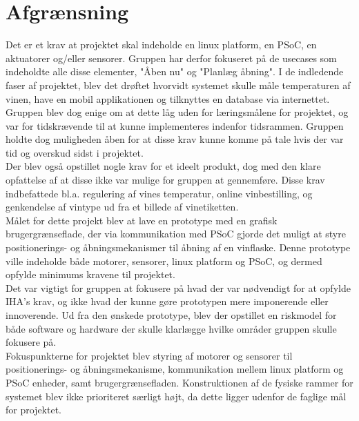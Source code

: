 \chapter{Afgrænsning}
Det er et krav at projektet skal indeholde en linux platform, en PSoC, en aktuatorer og/eller sensorer. Gruppen har derfor fokuseret på de usecases som 
indeholdte alle disse elementer, "Åben nu" og "Planlæg åbning". I de indledende faser af projektet, blev det drøftet hvorvidt systemet skulle måle temperaturen
af vinen, have en mobil applikationen og tilknyttes en database via internettet. Gruppen blev dog enige om at dette låg uden for læringsmålene for projektet, 
og var for tidskrævende til at kunne implementeres indenfor tidsrammen. Gruppen holdte dog muligheden åben for at disse krav kunne komme på tale hvis der var
tid og overskud sidst i projektet. \\

Der blev også opstillet nogle krav for et ideelt produkt, dog med den klare opfattelse af at disse ikke var mulige for gruppen at gennemføre. Disse krav 
indbefattede bl.a. regulering af vines temperatur, online vinbestilling, og genkendelse af vintype ud fra et billede af vinetiketten.\\

Målet for dette projekt blev at lave en prototype med en grafisk brugergrænseflade, der via kommunikation med PSoC gjorde det muligt at styre positionerings- 
og åbningsmekanismer til åbning af en vinflaske. Denne prototype ville indeholde både motorer, sensorer, linux platform og PSoC, og dermed opfylde minimums 
kravene til projektet. \\

Det var vigtigt for gruppen at fokusere på hvad der var nødvendigt for at opfylde IHA's krav, og ikke hvad der kunne gøre prototypen mere 
imponerende eller innoverende. Ud fra den ønskede prototype, blev der opstillet en riskmodel for både software og hardware der skulle klarlægge hvilke områder 
gruppen skulle fokusere på.\\ 

Fokuspunkterne for projektet blev styring af motorer og sensorer til positionerings- og åbningsmekanisme, kommunikation mellem 
linux platform og PSoC enheder, samt brugergrænsefladen. Konstruktionen af de fysiske rammer for systemet blev ikke prioriteret særligt højt, da dette ligger 
udenfor de faglige mål for projektet.       